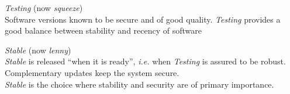 \documentclass[letterpaper,landscape]{report}
\begin{document}
\begin{multicols}{3}
\begin{description}[nolistsep,leftmargin=1pc,topsep=1em]
\item[``Always-ready-to-release'']  \emph{Testing} (now \emph{squeeze})\\
  Software versions known to be secure and of good quality.
  \emph{Testing} provides a good balance between stability and recency
  of software

\item[Official release]\hfill\emph{Stable} (now \emph{lenny})\\
  \emph{Stable} is released ``when it is ready'', \emph{i.e.} when
  \emph{Testing} is assured to be robust. %
  Complementary updates keep the
  system secure. \\
  \emph{Stable} is the choice where stability and security are of
  primary importance.
\end{description}

\end{multicols}
\end{document}
